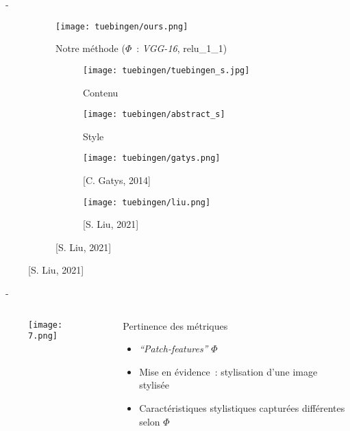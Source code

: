 \documentclass[aspectratio=169, 22pt]{beamer}
\begin{document}
\begin{frame}{\secname~- \subsecname}
  \begin{figure}
    \begin{subfigure}{0.47\linewidth}
      \texttt{[image: tuebingen/ours.png]}
      \caption{Notre méthode ($\Phi$ : \emph{VGG-16}, relu\_1\_1)}
    \end{subfigure}
    \begin{subfigure}{0.45\linewidth}
      \begin{subfigure}{0.45\linewidth}
        \texttt{[image: tuebingen/tuebingen\_s.jpg]}
        \caption{Contenu}
      \end{subfigure}
      \begin{subfigure}{0.45\linewidth}
        \texttt{[image: tuebingen/abstract\_s]}
        \caption{Style}
      \end{subfigure}

      \begin{subfigure}{0.45\linewidth}
        \texttt{[image: tuebingen/gatys.png]}
        \caption{[C. Gatys, 2014]}
      \end{subfigure}
      \begin{subfigure}{0.45\linewidth}
        \texttt{[image: tuebingen/liu.png]}
        \caption{[S. Liu, 2021]}
      \end{subfigure}
    \end{subfigure}
  \end{figure}
\end{frame}


\begin{frame}{\secname~- \subsecname}
  \begin{columns}
    \begin{column}{0.5\linewidth}
      \begin{figure}
        \centering
        \texttt{[image: 7.png]}
      \end{figure}
    \end{column}
    \begin{column}{0.5\linewidth}
      \begin{block}{Pertinence des métriques}
        \begin{itemize}
        \item \emph{``Patch-features''} $\Phi$
        \item Mise en évidence : stylisation d'une image stylisée
        \item Caractéristiques stylistiques capturées différentes selon $\Phi$
        \end{itemize}
      \end{block}
    \end{column}
  \end{columns}
\end{frame}
\end{document}
